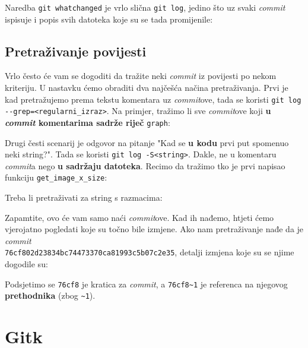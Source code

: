 Naredba \verb+git whatchanged+ je vrlo slična \verb+git log+, jedino što uz svaki \emph{commit} ispisuje i popis svih datoteka koje su se tada promijenile:



\subsection*{Pretraživanje povijesti}

Vrlo često će vam se dogoditi da tražite neki \emph{commit} iz povijesti po nekom kriteriju.
U nastavku ćemo obraditi dva najčešća načina pretraživanja.
Prvi je kad pretražujemo prema tekstu komentara uz \emph{commit}ove, tada se koristi \verb+git log --grep=<regularni_izraz>+.
Na primjer, tražimo li sve \emph{commit}ove koji \textbf{u \emph{commit} komentarima sadrže riječ} \verb+graph+:


Drugi česti scenarij je odgovor na pitanje "Kad se \textbf{u kodu} prvi put spomenuo neki string?". Tada se koristi \verb+git log -S<string>+.
Dakle, ne u komentaru \emph{commit}a nego \textbf{u sadržaju datoteka}.
Recimo da tražimo tko je prvi napisao funkciju \verb+get_image_x_size+:


Treba li pretraživati za string s razmacima:


Zapamtite, ovo će vam samo naći \emph{commit}ove.
Kad ih nađemo, htjeti ćemo vjerojatno pogledati koje su točno bile izmjene.
Ako nam pretraživanje nađe da je \emph{commit} \\ \verb+76cf802d23834bc74473370ca81993c5b07c2e35+, detalji izmjena koje su se njime dogodile su:


Podsjetimo se \verb+76cf8+ je kratica za \emph{commit}, a \verb+76cf8~1+ je referenca na njegovog \textbf{prethodnika} (zbog \verb+~1+).




\section*{Gitk}

